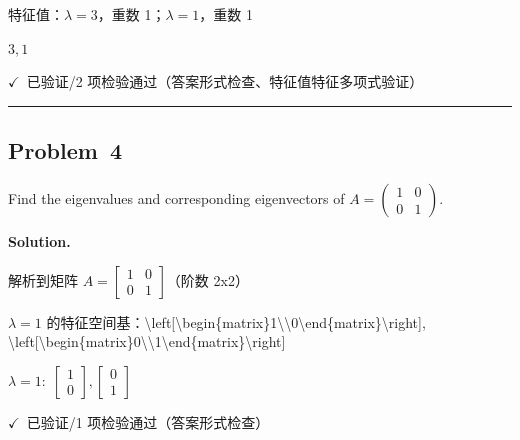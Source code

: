 \documentclass[12pt, a4paper]{article}
\newcommand{\problem}[1]{\subsection*{Problem~#1}}
\newcommand{\solution}{%
  \par\noindent
  {\color{solutiongreen}\bfseries Solution.}\par
}
\newcommand{\verifyok}{\textcolor{solutiongreen}{\ensuremath{\checkmark}\ 已验证}}
\begin{document}
\begin{stepbox}
特征值：$\lambda = 3$，重数 1；$\lambda = 1$，重数 1
\end{stepbox}

\begin{center}
$\boxed{3, 1}$
\end{center}

\begin{verifybox}\small \verifyok{}/2 项检验通过（答案形式检查、特征值特征多项式验证） \end{verifybox}

\vspace{0.8em}\hrule\vspace{0.8em}

\problem{4}

\begin{stepbox}
Find the eigenvalues and corresponding eigenvectors of
$A = \begin{pmatrix} 1 & 0 \\ 0 & 1 \end{pmatrix}$.
\end{stepbox}

\solution

\begin{stepbox}
解析到矩阵 $A = \left[\begin{matrix}1 & 0\\0 & 1\end{matrix}\right]$（阶数 2x2）
\end{stepbox}

\begin{stepbox}
$\lambda=1$ 的特征空间基：\textbackslash{}left[\textbackslash{}begin\{matrix\}1\textbackslash{}\textbackslash{}0\textbackslash{}end\{matrix\}\textbackslash{}right], \textbackslash{}left[\textbackslash{}begin\{matrix\}0\textbackslash{}\textbackslash{}1\textbackslash{}end\{matrix\}\textbackslash{}right]
\end{stepbox}

\begin{center}
$\boxed{\lambda = 1: \; \left[\begin{matrix}1\\0\end{matrix}\right], \left[\begin{matrix}0\\1\end{matrix}\right]}$
\end{center}

\begin{verifybox}\small \verifyok{}/1 项检验通过（答案形式检查） \end{verifybox}
\end{document}
